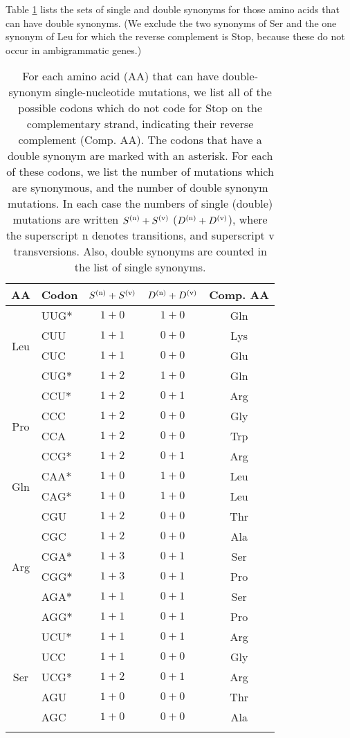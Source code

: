 \documentclass[unnumsec,webpdf,contemporary,large]{oup-authoring-template}%
\theoremstyle{thmstyleone}%
\theoremstyle{thmstyletwo}%
\theoremstyle{thmstylethree}%
\begin{document}
Table \ref{tab: 1} lists the sets of single and double synonyms for those amino acids
that can have double synonyms. (We exclude the two synonyms of Ser and the one synonym
of Leu for which the reverse complement is Stop, because these do not occur in ambigrammatic
genes.)

\begin{table}[t]
\caption{For each amino acid (AA) that can have double-synonym single-nucleotide mutations, we list
all of the possible codons which do not code for Stop on the complementary strand, indicating
their reverse complement (Comp. AA).
The codons that have a double synonym are marked with an asterisk.
For each of these codons, we list the number of mutations which are synonymous,
and the number of double synonym mutations. In each case the numbers of single (double) mutations are written
$S^{({\rm n})}+S^{({\rm v})}$ ($D^{({\rm n})}+D^{({\rm v})}$), where the superscript n denotes transitions,
and superscript v transversions. Also, double synonyms are counted in the list of single synonyms.
\label{tab: 1}}
\begin{tabular*}{\columnwidth}{@{\extracolsep\fill}clccc@{\extracolsep\fill}}
\toprule
AA&Codon&$S^{({\rm n})}+S^{({\rm v})}$&$D^{({\rm n})}+D^{({\rm v})}$&Comp. AA\\
\midrule
\multirow{4}{*}{Leu} &UUG$\ast$&$1+0$&$1+0$&Gln\\
       &CUU&$1+1$&$0+0$&Lys\\
       &CUC&$1+1$&$0+0$&Glu\\
       &CUG$\ast$&$1+2$&$1+0$&Gln\\
\midrule
\multirow{4}{*}{Pro} &CCU$\ast$&$1+2$&$0+1$&Arg\\
       &CCC&$1+2$&$0+0$&Gly\\
       &CCA&$1+2$&$0+0$&Trp\\
       &CCG$\ast$&$1+2$&$0+1$&Arg\\
\midrule
\multirow{2}{*}{Gln} &CAA$\ast$&$1+0$&$1+0$&Leu\\
       &CAG$\ast$&$1+0$&$1+0$&Leu\\
\midrule
\multirow{6}{*}{Arg} &CGU&$1+2$&$0+0$&Thr\\
       &CGC&$1+2$&$0+0$&Ala\\
       &CGA$\ast$&$1+3$&$0+1$&Ser\\
       &CGG$\ast$&$1+3$&$0+1$&Pro\\
       &AGA$\ast$&$1+1$&$0+1$&Ser\\
       &AGG$\ast$&$1+1$&$0+1$&Pro\\
\midrule
\multirow{5}{*}{Ser} &UCU$\ast$&$1+1$&$0+1$&Arg\\
       &UCC&$1+1$&$0+0$&Gly\\
       &UCG$\ast$&$1+2$&$0+1$&Arg\\
       &AGU&$1+0$&$0+0$&Thr\\
       &AGC&$1+0$&$0+0$&Ala\\
\botrule
\end{tabular*}
\end{table}
\end{document}

